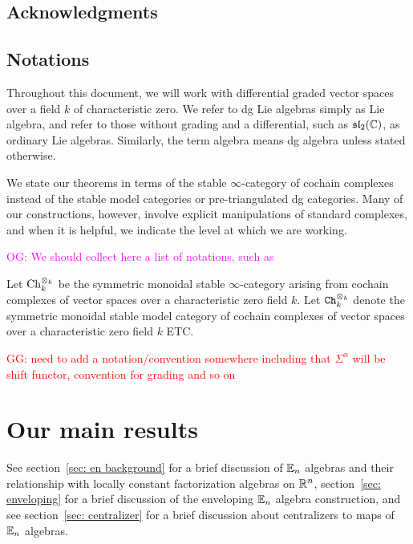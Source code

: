 \documentclass[11pt]{amsart}
\numberwithin{equation}{section}
\def\owen{\textcolor{magenta}{OG: }\textcolor{magenta}}
\def\greg{\textcolor{red}{GG: }\textcolor{red}}
\begin{document}
\subsection{Acknowledgments}

\subsection{Notations}

\begin{rmk}
Throughout this document, we will work with differential graded vector spaces over a field $k$ of characteristic zero. We refer to dg Lie algebras simply as Lie algebra, and refer to those without grading and a differential, such as $\frak{sl}_2(\mathbb C)$, as ordinary Lie algebras. Similarly, the term algebra means dg algebra unless stated otherwise.
\end{rmk}

\begin{rmk}
We state our theorems in terms of the stable $\infty$-category of cochain complexes 
instead of the stable model categories or pre-triangulated dg categories. 
Many of our constructions, however, involve explicit manipulations of standard complexes, 
and when it is helpful, we indicate the level at which we are working.
\end{rmk}

\owen{We should collect here a list of notations, such as}

Let ${\rm Ch}_k^{\otimes_k}$ be the symmetric monoidal stable $\infty$-category arising from cochain complexes of vector spaces over a characteristic zero field $k$.
Let ${\tt Ch}_k^{\otimes_k}$ denote the symmetric monoidal stable model category of cochain complexes of vector spaces over a characteristic zero field $k$ ETC.

\greg{need to add a notation/convention somewhere including that $\Sigma^n$ will be shift functor, convention for grading and so on}

\section{Our main results}

See section~\ref{sec: en background} for a brief discussion of $\mathbb E_n$ algebras and their relationship with locally constant factorization algebras on $\mathbb R^n$, section~\ref{sec: enveloping} for a brief discussion of the enveloping $\mathbb E_n$ algebra construction, and see section~\ref{sec: centralizer} 
for a brief discussion about centralizers to maps of $\mathbb E_n$ algebras.
\end{document}
